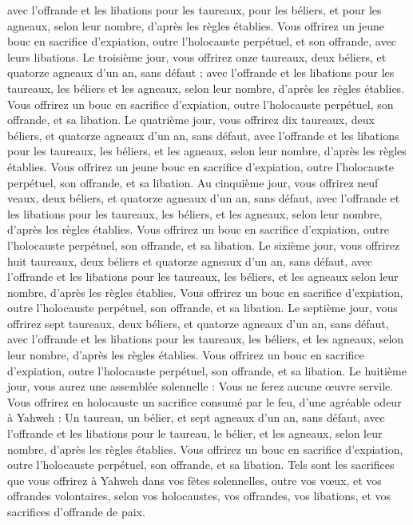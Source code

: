 \begin{multicols}{2}
avec l’offrande et les libations pour les taureaux, pour les béliers, et pour les agneaux, selon leur nombre, d’après les règles établies.
Vous offrirez un jeune bouc en sacrifice d’expiation, outre l'holocauste perpétuel, et son offrande, avec leurs libations.
Le troisième jour, vous offrirez onze taureaux, deux béliers, et quatorze agneaux d'un an, sans défaut ;
avec l’offrande et les libations pour les taureaux, les béliers et les agneaux, selon leur nombre, d’après les règles établies.
Vous offrirez un bouc en sacrifice d’expiation, outre l'holocauste perpétuel, son offrande, et sa libation.
Le quatrième jour, vous offrirez dix taureaux, deux béliers, et quatorze agneaux d'un an, sans défaut,
avec l’offrande et les libations pour les taureaux, les béliers, et les agneaux, selon leur nombre, d’après les règles établies.
Vous offrirez un jeune bouc en sacrifice d’expiation, outre l'holocauste perpétuel, son offrande, et sa libation.
Au cinquième jour, vous offrirez neuf veaux, deux béliers, et quatorze agneaux d'un an, sans défaut,
avec l’offrande et les libations pour les taureaux, les béliers, et les agneaux, selon leur nombre, d’après les règles établies.
Vous offrirez un bouc en sacrifice d’expiation, outre l'holocauste perpétuel, son offrande, et sa libation.
Le sixième jour, vous offrirez huit taureaux, deux béliers et quatorze agneaux d'un an, sans défaut,
avec l’offrande et les libations pour les taureaux, les béliers, et les agneaux selon leur nombre, d’après les règles établies.
Vous offrirez un bouc en sacrifice d’expiation, outre l'holocauste perpétuel, son offrande, et sa libation.
Le septième jour, vous offrirez sept taureaux, deux béliers, et quatorze agneaux d'un an, sans défaut,
avec l’offrande et les libations pour les taureaux, les béliers, et les agneaux, selon leur nombre, d’après les règles établies.
Vous offrirez un bouc en sacrifice d’expiation, outre l'holocauste perpétuel, son offrande, et sa libation.
Le huitième jour, vous aurez une assemblée solennelle : Vous ne ferez aucune œuvre servile.
Vous offrirez en holocauste un sacrifice consumé par le feu, d’une agréable odeur à Yahweh : Un taureau, un bélier, et sept agneaux d'un an, sans défaut,
avec l’offrande et les libations pour le taureau, le bélier, et les agneaux, selon leur nombre, d’après les règles établies.
Vous offrirez un bouc en sacrifice d’expiation, outre l'holocauste perpétuel, son offrande, et sa libation.
Tels sont les sacrifices que vous offrirez à Yahweh dans vos fêtes solennelles, outre vos vœux, et vos offrandes volontaires, selon vos holocaustes, vos offrandes, vos libations, et vos sacrifices d’offrande de paix.

\end{multicols}
